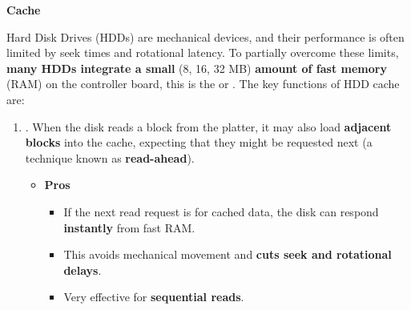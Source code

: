 \highspace
\begin{flushleft}
    \textcolor{Green3}{\faIcon{\speedIcon} \textbf{Cache}}
\end{flushleft}
Hard Disk Drives (HDDs) are mechanical devices, and their performance is often limited by seek times and rotational latency. To partially overcome these limits, \textbf{many HDDs integrate a small} (8, 16, 32 MB) \textbf{amount of fast memory} (RAM) on the controller board, this is the  or . The key functions of HDD cache are:
\begin{enumerate}
    \item {}. When the disk reads a block from the platter, it may also load \textbf{adjacent blocks} into the cache, expecting that they might be requested next (a technique known as \textbf{read-ahead}).
    \begin{itemize}
        \item[\textcolor{Green3}{\faIcon{check-circle}}] \textcolor{Green3}{\textbf{Pros}}
        \begin{itemize}[label=\textcolor{Green3}{}]
            \item If the next read request is for cached data, the disk can respond \textbf{instantly} from fast RAM.
            \item This avoids mechanical movement and \textbf{cuts seek and rotational delays}.
            \item Very effective for \textbf{sequential reads}.
        \end{itemize}
    \end{itemize}



\end{enumerate}
